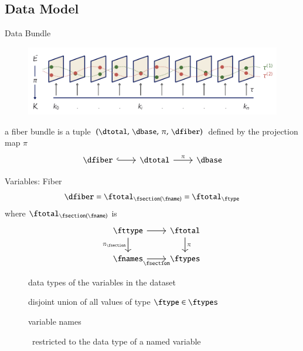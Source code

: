 \documentclass[xcolor={dvipsnames}, handout]{beamer}
\begin{document}
\subsection{Data Model}

\begin{frame}{Data Bundle}
    \begin{figure}
        \includegraphics[width=1\textwidth]{figures/math/fiberbundle.png}
    \end{figure}
    a fiber bundle is a tuple $(\dtotal,\,\dbase,\,\pi ,\,\dfiber)$ defined by the projection map $\pi$
    \begin{equation}
        \label{eq:fiber_bundle}
        \begin{tikzcd}[ampersand replacement=\&]
            \dfiber \arrow[r, hook] \& \dtotal \arrow[r, "\pi"] \& \dbase
        \end{tikzcd}
    \end{equation}
\end{frame}

\begin{frame}{Variables: Fiber}
    \begin{equation}
        \dfiber = \ftotal_{\fsection(\fname)} = \ftotal_{\ftype} 
    \end{equation}
    where $\ftotal_{\fsection(\fname)}$ is 
    \begin{equation}
        \label{eq:data_types}
        \begin{tikzcd}[ampersand replacement=\&]
            \fttype \arrow[r] \arrow[d, "\pi_{\fsection}"'] \& \ftotal \arrow[d, "\pi"] \\
            \fnames \arrow[r, "\fsection"']                  \& \ftypes       
        \end{tikzcd}
    \end{equation}
    \begin{description}
        \item[\ftypes] data types of the variables in the dataset 
        \item[\ftotal] disjoint union of all values of type $\ftype \in \ftypes$ 
        \item[\fnames] variable names
        \item[\fttype] \ftotal\ restricted to the data type of a named variable   
    \end{description}
\end{frame}
\end{document}
